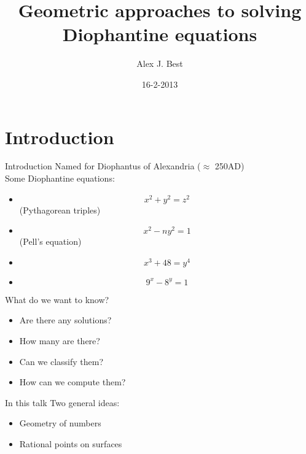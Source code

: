 \documentclass{beamer}
\title{Geometric approaches to solving Diophantine equations}
\author[Alex J. Best]{Alex J. Best}
\institute{Tomorrows Mathematicians Today 2013}
\date{16-2-2013}
\begin{document}
\begin{frame}
\titlepage
\end{frame}

\section{Introduction}
\begin{frame}{Introduction}
Named for Diophantus of Alexandria ($\approx$ 250AD) \\
Some Diophantine equations:
\begin{itemize}
\item<2->{$$x^2 + y^2 = z^2$$ (Pythagorean triples)}
\item<3->{$$x^2 - ny^2 = 1$$ (Pell's equation)}
\item<4->{$$x^3 + 48 = y^4$$}
\item<5->{$$9^x - 8^y = 1$$}
\end{itemize}
\end{frame}

\begin{frame}{What do we want to know?}
\begin{itemize}
\item<2->{Are there any solutions?}
\item<3->{How many are there?}
\item<4->{Can we classify them?}
\item<5->{How can we compute them?}
\end{itemize}
\end{frame}

\begin{frame}{In this talk}
Two general ideas:
\begin{itemize}
\item<2->{Geometry of numbers}
\item<3->{Rational points on surfaces}
\end{itemize}
\end{frame}
\end{document}
